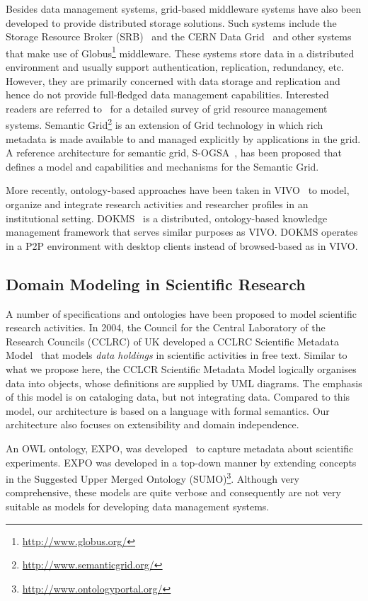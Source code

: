 \documentclass[preprint,12pt]{elsarticle}
\begin{document}
Besides data management systems, grid-based middleware systems have also been developed to provide distributed storage solutions. Such systems include the Storage Resource Broker (SRB)~\cite{783165} and the CERN Data Grid~\cite{652836} and other systems that make use of Globus\footnote{\url{http://www.globus.org/}} middleware. These systems store data in a distributed environment and usually support authentication, replication, redundancy, etc. However, they are primarily  concerned with data storage and replication and hence do not provide full-fledged data management capabilities. Interested readers are referred to~\cite{565296} for a detailed survey of grid resource management systems. Semantic Grid\footnote{\url{http://www.semanticgrid.org/}} is an extension of Grid technology in which rich metadata is made available to and managed explicitly by applications in the grid. A reference architecture for semantic grid, S-OGSA~\cite{citeulike:1021910}, has been proposed that defines a model and capabilities and mechanisms for the Semantic Grid.

More recently, ontology-based approaches have been taken in VIVO~\cite{vivo10} to model, organize and integrate research activities and researcher profiles in an institutional setting. DOKMS~\cite{Pirro201038} is a distributed, ontology-based knowledge management framework that serves similar purposes as VIVO. DOKMS operates in a P2P environment with desktop clients instead of browsed-based as in VIVO.

\subsection{Domain Modeling in Scientific Research}
A number of specifications and ontologies have been proposed to model scientific research activities. In 2004, the Council for the Central Laboratory of the Research Councils (CCLRC) of UK developed a CCLRC Scientific Metadata Model~\cite{Spallation_metadatamodel} that models \emph{data holdings} in scientific activities in free text. Similar to what we propose here, the CCLCR Scientific Metadata Model logically organises data into objects, whose  definitions are supplied by UML diagrams. The emphasis of this model is on cataloging data, but not integrating data. Compared to this model, our architecture is based on a language with formal semantics. Our architecture also focuses on extensibility and domain independence.

An OWL ontology, EXPO, was developed~\cite{citeulike:3735746} to capture metadata about scientific experiments. EXPO was developed in a top-down manner by extending concepts in the Suggested Upper Merged Ontology (SUMO)\footnote{\url{http://www.ontologyportal.org/}}. Although very comprehensive, these models are quite verbose and consequently are not very suitable as models for developing data management systems.
\end{document}

